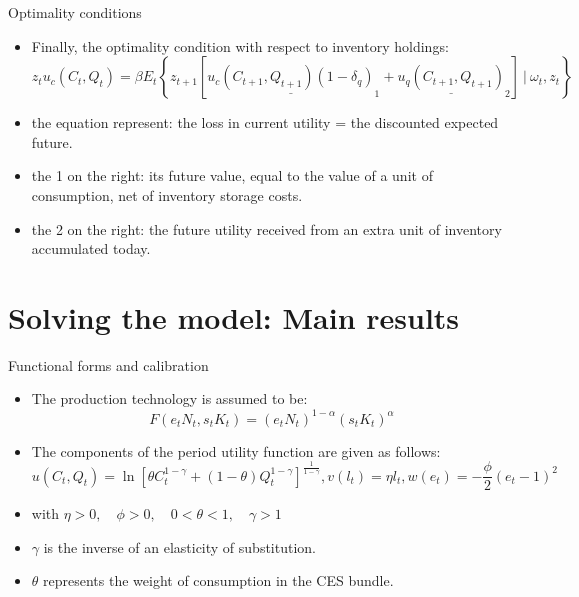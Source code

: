 \documentclass[fontset=windows,12pt,t,aspectratio=169]{beamer}
\begin{document}
\begin{frame}{Optimality conditions}
    \begin{itemize}
        \item Finally, the optimality condition with respect to inventory holdings:
       \[
z_t u_c(C_t, Q_t) = \beta E_t \left\{ z_{t+1} [\underline{u_c(C_{t+1}, Q_{t+1}) (1 - \delta_q)}_{\text{1}} + \underline{u_q(C_{t+1}, Q_{t+1})}_{\text{2}}] \  \vert \  \omega_t, z_t \right\} \tag{8}
\]
        \item the equation represent: the loss in current utility = the discounted expected future.
        \item the 1 on the right: its future value, equal to the value of a unit of consumption, net of inventory storage costs.
        \item the 2 on the right: the future utility received from an extra unit of inventory accumulated today.
    \end{itemize}
\end{frame}

\section{Solving the model: Main results}
\begin{frame}{Functional forms and calibration}
    \begin{itemize}
       \item The production technology is assumed to be:
       $$ F(e_tN_t, s_tK_t) = (e_t N_t)^{1-\alpha} (s_t K_t)^{\alpha}$$
       \item The components of the period utility function are given as follows:
       $$ u(C_t, Q_t) = \ln\left[ \theta C_t^{1-\gamma} + (1-\theta) Q_t^{1-\gamma} \right]^{\frac{1}{1-\gamma}}, v(l_t) = \eta l_t, w(e_t) = -\frac{\phi}{2}(e_t - 1)^2 $$
       \item with $\eta > 0, \quad \phi > 0, \quad 0 < \theta < 1, \quad \gamma > 1  $
       \item  $\gamma$ is the inverse of an elasticity of substitution.
       \item  $\theta$ represents the weight of consumption in the CES bundle.
    \end{itemize}
\end{frame}
\end{document}
